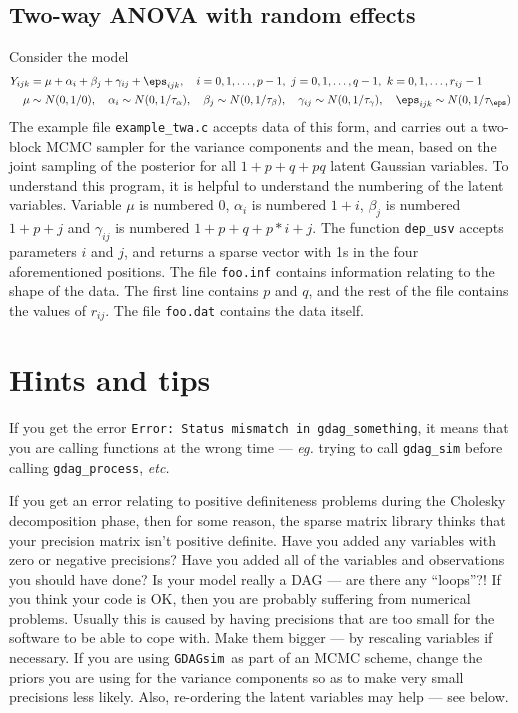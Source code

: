 \documentclass[12pt,a4paper]{article}
\newcommand{\gds}{\texttt{GDAGsim}}
\begin{document}
\subsection{Two-way ANOVA with random effects}

Consider the model
\begin{align*}
Y_{ijk} &= \mu + \alpha_i + \beta_j + \gamma_{ij} + \eps_{ijk},\quad
i=0,1,\ldots,p-1,\ j=0,1,\ldots,q-1,\ k=0,1,\ldots,r_{ij}-1 \\
\mu &\sim N(0,1/0),\quad \alpha_i \sim N(0,1/\tau_\alpha),\quad
\beta_j \sim N(0,1/\tau_\beta),\quad 
\gamma_{ij} \sim N(0,1/\tau_\gamma),\quad 
\eps_{ijk} \sim N(0,1/\tau_\eps)
\end{align*}
The example file \verb$example_twa.c$ accepts data of this form, and
carries out a two-block MCMC sampler for the variance components and
the mean, based on the joint sampling of the posterior for all
$1+p+q+pq$ latent Gaussian variables. To understand this program, it is
helpful to understand the numbering of the latent variables. Variable
$\mu$ is numbered 0, $\alpha_i$ is numbered $1+i$, $\beta_j$ is
numbered $1+p+j$ and $\gamma_{ij}$ is numbered $1+p+q+p*i+j$. The
function \verb$dep_usv$ accepts parameters $i$ and $j$, and returns a
sparse vector with 1s in the four aforementioned positions. The file
\verb$foo.inf$ contains information relating to the shape of the
data. The first line contains $p$ and $q$, and the rest of the file
contains the values of $r_{ij}$. The file \verb$foo.dat$ contains the
data itself.

\section{Hints and tips}

If you get the error 
\verb$Error: Status mismatch in gdag_something$, it means that you are
calling functions at the wrong time --- \emph{eg.} trying to call
\verb$gdag_sim$ before calling \verb$gdag_process$, \emph{etc.}

If you get an error relating to positive definiteness problems during
the Cholesky decomposition phase, then for some reason, the sparse
matrix library thinks that your precision matrix isn't positive
definite. Have you added any variables with zero or negative
precisions? Have you added all of the variables and observations you
should have done? Is your model really a DAG --- are there any
``loops''?! If you think your code is OK, then you are probably
suffering from numerical problems. Usually this is caused by having
precisions that are too small for the software to be able to cope
with. Make them bigger --- by rescaling variables if necessary. If you
are using \gds\ as part of an MCMC scheme, change the priors you are
using for the variance components so as to make very small precisions
less likely. Also, re-ordering the latent variables may help --- see
below.
\end{document}
